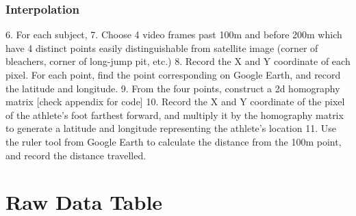 \documentclass[index]{subfiles}
\begin{document}
\subsubsection{Interpolation}
6. For each subject,
7. Choose 4 video frames past 100m and before 200m which have 4 distinct points easily distinguishable from satellite image (corner of bleachers, corner of long-jump pit, etc.)
8. Record the X and Y coordinate of each pixel. For each point, find the point corresponding on Google Earth, and record the latitude and longitude.
9. From the four points, construct a 2d homography matrix [check appendix for code]
10. Record the X and Y coordinate of the pixel of the athlete's foot farthest forward, and multiply it by the homography matrix to generate a latitude and longitude representing the athlete's location
11. Use the ruler tool from Google Earth to calculate the distance from the 100m point, and record the distance travelled.

\section{Raw Data Table}
\end{document}
